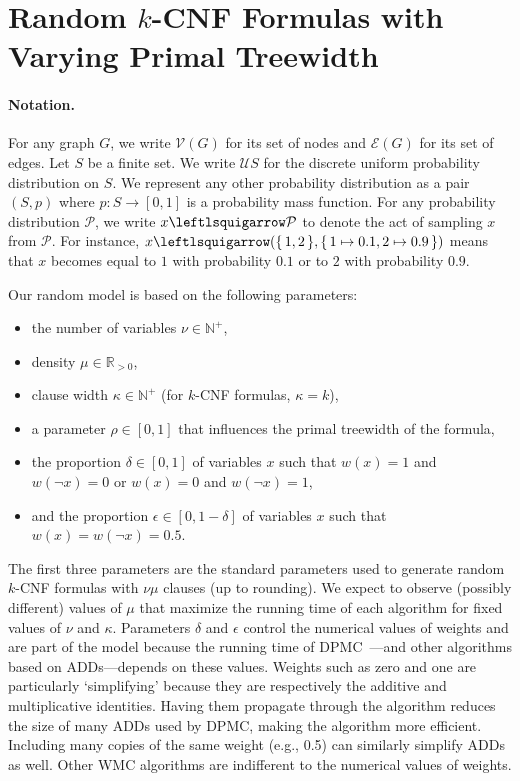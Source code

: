 \documentclass[runningheads]{llncs}
\begin{document}
\section{Random $k$-CNF Formulas with Varying Primal Treewidth}\label{sec:model}

\paragraph{Notation.}
For any graph $G$, we write $\mathcal{V}(G)$ for its set of nodes and
$\mathcal{E}(G)$ for its set of edges. Let $S$ be a finite set. We write
$\mathcal{U}S$ for the discrete uniform probability distribution on $S$. We
represent any other probability distribution as a pair $(S, p)$ where
$p\colon S \to [0, 1]$ is a probability mass function. For any probability
distribution $\mathcal{P}$, we write $x \leftlsquigarrow \mathcal{P}$ to denote
the act of sampling $x$ from $\mathcal{P}$. For instance,
$x \leftlsquigarrow (\{\, 1, 2 \,\}, \{\, 1 \mapsto 0.1, 2 \mapsto 0.9 \,\})$
means that $x$ becomes equal to $1$ with probability $0.1$ or to $2$ with
probability $0.9$.

Our random model is based on the following parameters:
\begin{itemize}
\item the number of variables $\nu \in \mathbb{N}^+$,
\item density $\mu \in \mathbb{R}_{>0}$,
\item clause width $\kappa \in \mathbb{N}^+$ (for $k$-CNF formulas, $\kappa =
  k$),
\item a parameter $\rho \in [0, 1]$ that influences the primal treewidth of
  the formula,
\item the proportion $\delta \in [0, 1]$ of variables $x$ such that $w(x) = 1$
  and $w(\neg x) = 0$ or $w(x) = 0$ and $w(\neg x) = 1$,
\item and the proportion $\epsilon \in [0, 1-\delta]$ of variables $x$ such that
  $w(x) = w(\neg x) = 0.5$.
\end{itemize}
The first three parameters are the standard parameters used to generate random
$k$-CNF formulas with $\nu\mu$ clauses (up to rounding). We expect to observe
(possibly different) values of $\mu$ that maximize the running time of each
algorithm for fixed values of $\nu$ and $\kappa$. Parameters $\delta$ and
$\epsilon$ control the numerical values of weights and are part of the model
because the running time of \textsc{DPMC}~\cite{DBLP:conf/cp/DudekPV20}---and
other algorithms based on ADDs---depends on these values. Weights such as zero
and one are particularly `simplifying' because they are respectively the
additive and multiplicative identities. Having them propagate through the
algorithm reduces the size of many ADDs used by \textsc{DPMC}, making the
algorithm more efficient. Including many copies of the same weight (e.g., 0.5)
can similarly simplify ADDs as well. Other \textsf{WMC} algorithms are
indifferent to the numerical values of weights.
\end{document}
